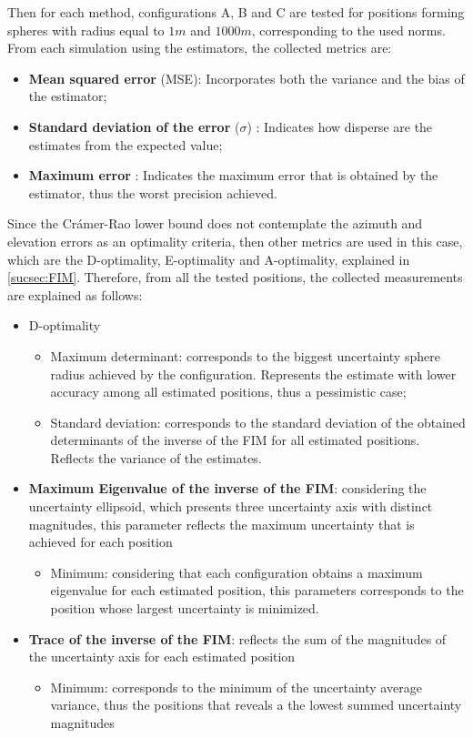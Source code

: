Then for each method, configurations A, B and C are tested for positions forming spheres with radius equal to $1m$ and $1000m$, corresponding to the used norms. From each simulation using the estimators, the collected metrics are:
 
\begin{itemize}
	\item \textbf{Mean squared error} (MSE): Incorporates both the variance and the bias of the estimator;
	
	\item \textbf{Standard deviation of the error} ($\sigma$) : Indicates how disperse are the estimates from the expected value;
	
	\item \textbf{Maximum error} : Indicates the maximum error that is obtained by the estimator, thus the worst precision achieved.
\end{itemize} 

Since the Crámer-Rao lower bound does not contemplate the azimuth and elevation errors as an optimality criteria, then other metrics are used in this case, which are the D-optimality, E-optimality and A-optimality, explained in \ref{sucsec:FIM}. Therefore, from all the tested positions, the collected measurements are explained as follows: 

\begin{itemize}
	\item D-optimality
	\begin{itemize}
		\item Maximum determinant: corresponds to the biggest uncertainty sphere radius achieved by the configuration. Represents the estimate with lower accuracy among all estimated positions, thus a pessimistic case;
		\item Standard deviation: corresponds to the standard deviation of the obtained determinants of the inverse of the FIM for all estimated positions. Reflects the variance of the estimates.
	\end{itemize}
	\item \textbf{ Maximum Eigenvalue of the inverse of the FIM}: considering the uncertainty ellipsoid, which presents three uncertainty axis with distinct magnitudes, this parameter reflects the maximum uncertainty that is achieved for each position
	\begin{itemize}
		\item Minimum: considering that each configuration obtains a maximum eigenvalue for each estimated position, this parameters corresponds to the position whose largest uncertainty is minimized.
	\end{itemize}
	\item \textbf{Trace of the inverse of the FIM}: reflects the sum of the magnitudes of the uncertainty axis for each estimated position
	\begin{itemize}
		\item Minimum: corresponds to the minimum of the uncertainty average variance, thus the positions that reveals a the lowest summed uncertainty magnitudes
	\end{itemize}
\end{itemize}



